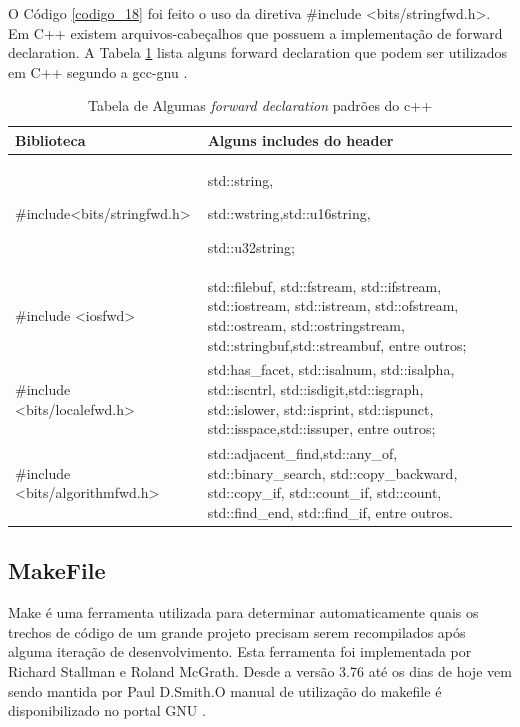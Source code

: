 O Código \ref{codigo_18} foi feito o uso da diretiva \#include
 <bits/stringfwd.h>. Em C++  existem arquivos-cabeçalhos que possuem a
 implementação de forward declaration. A Tabela \ref{tab:tabela_04} lista 
 alguns forward declaration que podem ser utilizados em C++ segundo
 a gcc-gnu \cite{gcc-api}.

\begin{table}[h]
    \centering
	\begin{tabular}{ |l|p{10cm} | l|p{10cm} |}
	\hline
	Biblioteca & Alguns includes do header\\
	\hline

	\#include<bits/stringfwd.h> & std::string,

								 std::wstring,std::u16string, 

								 std::u32string;\\
	\hline
	\#include <iosfwd> & std::filebuf, std::fstream,
						std::ifstream, std::iostream,
						std::istream, std::ofstream,
						std::ostream, std::ostringstream,
						std::stringbuf,std::streambuf,
						entre outros;\\
	\hline
	\#include <bits/localefwd.h> & std:has\_facet, std::isalnum,
								  std::isalpha, std::iscntrl,
								  std::isdigit,std::isgraph,
								  std::islower, std::isprint,
								  std::ispunct,
								  std::isspace,std::issuper,
								  entre outros;\\
	\hline
	\#include <bits/algorithmfwd.h> & std::adjacent\_find,std::any\_of,
									 std::binary\_search, 
									 std::copy\_backward, std::copy\_if,
									 std::count\_if, std::count,
									 std::find\_end, std::find\_if,
									 entre outros.\\
	\hline
	\end{tabular}
	\caption {Tabela de Algumas \textit{forward 
			  declaration} padrões do c++}
    \label{tab:tabela_04}
\end{table}


\subsection{MakeFile}\label{Makefile_section}


Make é uma ferramenta utilizada para determinar automaticamente quais
 os trechos de código de um grande projeto precisam serem recompilados
 após alguma iteração de desenvolvimento. Esta ferramenta foi implementada
 por Richard Stallman e Roland McGrath. Desde a versão 3.76 até os dias de
 hoje vem sendo mantida por Paul D.Smith\cite{Lasca2}.O manual de utilização do makefile
 é disponibilizado no portal GNU \cite{ref45}.

